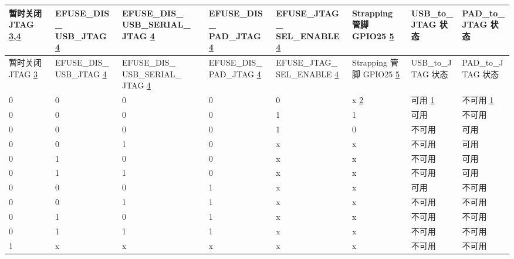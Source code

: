 
\begin{longtable}{ | p{1.4cm} | p{1.9cm} | p{2.1cm} | p{1.9cm} | p{2.1cm} | p{1.4cm} | p{2.1cm} | p{2.1cm} | }
\hline\rowcolor{lightgray}
暂时关闭 JTAG \hyperref[JTAG footnote: 3]{3},\hyperref[JTAG footnote: 4]{4} & EFUSE\_DIS\_ USB\_JTAG \hyperref[JTAG footnote: 4]{4} & EFUSE\_DIS\_ USB\_SERIAL\_ JTAG \hyperref[JTAG footnote: 4]{4} & EFUSE\_DIS\_ PAD\_JTAG \hyperref[JTAG footnote: 4]{4} & EFUSE\_JTAG\_ SEL\_ENABLE \hyperref[JTAG footnote: 4]{4} & Strapping 管脚 GPIO25 \hyperref[JTAG footnote: 5]{5} & USB\_to\_JTAG 状态 & PAD\_to\_JTAG 状态 \\ \hline
\endfirsthead
\hline
\rowcolor{lightgray}
暂时关闭 JTAG \hyperref[JTAG footnote: 3]{3} & EFUSE\_DIS\_ USB\_JTAG \hyperref[JTAG footnote: 4]{4} & EFUSE\_DIS\_ USB\_SERIAL\_ JTAG \hyperref[JTAG footnote: 4]{4} & EFUSE\_DIS\_ PAD\_JTAG \hyperref[JTAG footnote: 4]{4} & EFUSE\_JTAG\_ SEL\_ENABLE \hyperref[JTAG footnote: 4]{4} & Strapping 管脚 GPIO25  \hyperref[JTAG footnote: 5]{5} & USB\_to\_JTAG 状态 & PAD\_to\_JTAG 状态 \\ \hline
\hline
\endhead
\endfoot

0 & 0 & 0 & 0 & 0 & x \hyperref[JTAG footnote: 2]{2}	& 可用	 \hyperref[JTAG footnote: 1]{1}  &     不可用  \hyperref[JTAG footnote: 1]{1}  \\\hline
0 & 0 & 0 & 0 & 1 & 1	& 可用	 &  不可用   \\\hline
0 & 0 & 0 & 0 & 1 & 0	& 不可用 & 	可用 \\\hline
0 & 0 & 1 & 0 & x & x	& 不可用 & 	可用 \\\hline
0 & 1 & 0 & 0 & x & x	& 不可用 & 	可用 \\\hline
0 & 1 & 1 & 0 & x & x	& 不可用 & 	可用 \\\hline
0 & 0 & 0 & 1 & x & x	& 可用	 &  不可用 \\\hline
0 & 0 & 1 & 1 & x & x	& 不可用 & 	不可用 \\\hline
0 & 1 & 0 & 1 & x & x	& 不可用 & 	不可用 \\\hline
0 & 1 & 1 & 1 & x & x	& 不可用 & 	不可用 \\\hline
1 & x & x & x & x & x	& 不可用 & 	不可用 \\\hline

\end{longtable}


